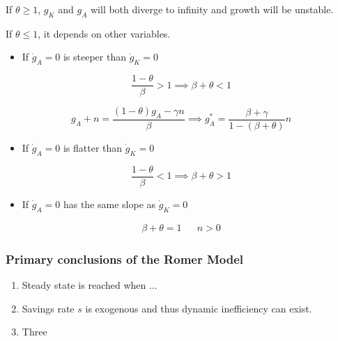 If $\theta \geq 1$, $g_{K}$ and $g_{A}$ will both diverge to infinity and growth will be unstable. 

If $\theta \leq 1$, it depends on other variables.

\begin{itemize}
    \item If $\Dot{g}_{A}=0$ is steeper than $\Dot{g}_{K}=0$
\end{itemize}
\begin{equation*}
    \frac{1-\theta}{\beta}>1 \implies \beta + \theta < 1
\end{equation*}

\begin{equation*}
    g_{A}+n=\frac{(1-\theta)g_{A}-\gamma n}{\beta} \implies g_{A}^*=\frac{\beta + \gamma }{1-(\beta+\theta)}n
\end{equation*}

\begin{itemize}
    \item If $\Dot{g}_{A}=0$ is flatter than $\Dot{g}_{K}=0$
\end{itemize}

\begin{equation*}
    \frac{1-\theta}{\beta}<1 \implies \beta + \theta >1
\end{equation*}

\begin{itemize}
    \item If $\Dot{g}_{A}=0$ has the same slope as $\Dot{g}_{K}=0$
\end{itemize}

\begin{align*}
    \beta+\theta=1 && n>0
\end{align*}


\subsubsection{Primary conclusions of the Romer Model}
\begin{enumerate}[i]
  \item Steady state is reached when ...
  \item Savings rate $s$ is exogenous and thus dynamic inefficiency can exist.
  \item Three
\end{enumerate}